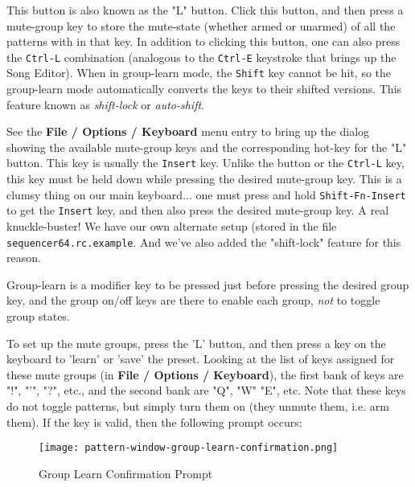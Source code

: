 
   This button is also known as the "L" button.
   Click this button, and then press a mute-group key
   to store the mute-state (whether armed or unarmed)
   of all the patterns with in that key.
   In addition to clicking this button, one can also press
   the \texttt{Ctrl-L} combination (analogous to the \texttt{Ctrl-E}
   keystroke that brings up the Song Editor).
   When in group-learn mode, the \texttt{Shift} key cannot be hit, so the
   group-learn mode automatically converts the keys to their shifted versions.
   This feature known as \textsl{shift-lock} or \textsl{auto-shift}.

   See the \textbf{File / Options / Keyboard} menu entry to bring up the
   dialog showing the available mute-group keys and the corresponding
   hot-key for the "L" button.
   This key is usually the \texttt{Insert} key.  Unlike the button or the
   \texttt{Ctrl-L} key, this key must be held down while pressing the desired
   mute-group key.
   This is a clumsy thing on our main keyboard... one must press and hold
   \texttt{Shift-Fn-Insert} to get the \texttt{Insert} key, and then also
   press the desired mute-group key.  A real knuckle-buster!
   We have our own alternate setup (stored in the file
   \texttt{sequencer64.rc.example}.
   And we've also added the "shift-lock" feature for this reason.

   Group-learn is a modifier key to be pressed
   just before pressing
   the desired group key, and the group on/off keys are there to enable
   each group, \textsl{not} to toggle group states.

   To set up the mute groups, press the 'L' button, and then press a key on
   the keyboard to 'learn' or 'save' the preset. Looking at the list of keys
   assigned for these mute groups (in \textbf{File / Options / Keyboard}),
   the first bank of keys are "!", "'", "?", etc., and the second bank are
   "Q", "W" "E", etc.  Note that these keys do not toggle patterns, but simply
   turn them on (they unmute them, i.e. arm them).
   If the key is valid, then the following prompt occurs:

\begin{figure}[H]
   \centering 
   \texttt{[image: pattern-window-group-learn-confirmation.png]}
   \caption{Group Learn Confirmation Prompt}
   \label{fig:pattern_window_group_learn_confirmation}
\end{figure}
   
